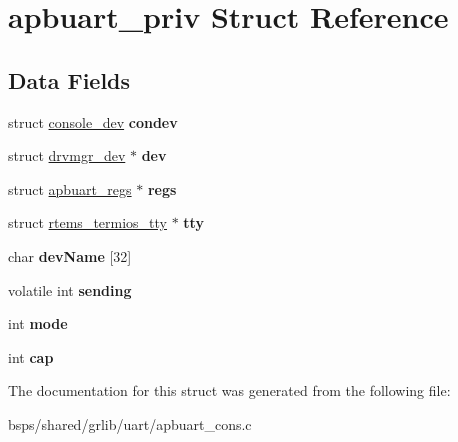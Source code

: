 \hypertarget{structapbuart__priv}{}\section{apbuart\+\_\+priv Struct Reference}
\label{structapbuart__priv}
\subsection*{Data Fields}
\begin{DoxyCompactItemize}
\item 
\mbox{\label{structapbuart__priv_a9d6cb92c011d1e6345e132e9843beac9}} 
struct \mbox{\hyperlink{structconsole__dev}{console\+\_\+dev}} {\bfseries condev}
\item 
\mbox{\label{structapbuart__priv_a505a7c63c215374f47c86e8749e5377e}} 
struct \mbox{\hyperlink{structdrvmgr__dev}{drvmgr\+\_\+dev}} $\ast$ {\bfseries dev}
\item 
\mbox{\label{structapbuart__priv_abca7e017b3bb31adceb738f550112207}} 
struct \mbox{\hyperlink{structapbuart__regs}{apbuart\+\_\+regs}} $\ast$ {\bfseries regs}
\item 
\mbox{\label{structapbuart__priv_a2d7eaf56f20ac4b7937b04b32b461a23}} 
struct \mbox{\hyperlink{structrtems__termios__tty}{rtems\+\_\+termios\+\_\+tty}} $\ast$ {\bfseries tty}
\item 
\mbox{\label{structapbuart__priv_a17e9e2de33ba0390ba15503752cc84e0}} 
char {\bfseries dev\+Name} \mbox{[}32\mbox{]}
\item 
\mbox{\label{structapbuart__priv_ab9215d4c02491ea2565e563e781abf19}} 
volatile int {\bfseries sending}
\item 
\mbox{\label{structapbuart__priv_a31bcc9a9f61c306d83f0254d2e68fc08}} 
int {\bfseries mode}
\item 
\mbox{\label{structapbuart__priv_ac5624b50af9b4dd4c609f684bc4c7e9c}} 
int {\bfseries cap}
\end{DoxyCompactItemize}


The documentation for this struct was generated from the following file\+:\begin{DoxyCompactItemize}
\item 
bsps/shared/grlib/uart/apbuart\+\_\+cons.\+c\end{DoxyCompactItemize}
